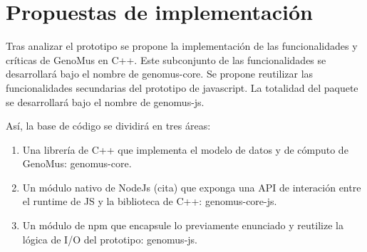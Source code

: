 \section{Propuestas de implementación}

Tras analizar el prototipo se propone la implementación de las funcionalidades y críticas de GenoMus en C++. Este subconjunto de las funcionalidades se desarrollará bajo el nombre de genomus-core. Se propone reutilizar las funcionalidades secundarias del prototipo de javascript. La totalidad del paquete se desarrollará bajo el nombre de genomus-js.

Así, la base de código se dividirá en tres áreas:

\begin{enumerate} 
    \item Una librería de C++ que implementa el modelo de datos y de cómputo de GenoMus: genomus-core\cite{genomus-core}.
    \item Un módulo nativo de NodeJs (cita) que exponga una API de interación entre el runtime de JS y la biblioteca de C++: genomus-core-js\cite{genomus-core-js}.
    \item Un módulo de npm que encapsule lo previamente enunciado y reutilize la lógica de I/O del prototipo: genomus-js.
\end{enumerate}